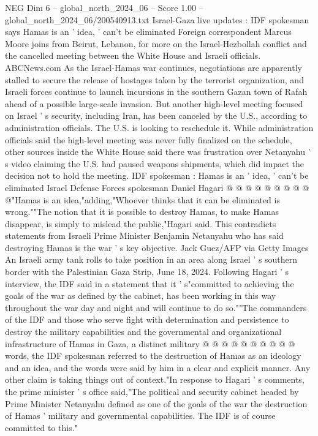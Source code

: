 \begin{textsample}{NEG Dim 6 – global\_north\_2024\_06 – Score 1.00 – global\_north\_2024\_06/200540913.txt}  \label{ex:f6_neg_311}
Israel-Gaza live updates : IDF spokesman says Hamas is an ' idea, ' can't be eliminated Foreign correspondent Marcus Moore joins from Beirut, Lebanon, for more on the Israel-Hezbollah conflict and the cancelled meeting between the White House and Israeli officials.
ABCNews.com As the Israel-Hamas war continues, negotiations are apparently stalled to secure the release of hostages taken by the terrorist organization, and Israeli forces continue to launch incursions in the southern Gazan town of Rafah ahead of a possible large-scale invasion.
But another high-level meeting focused on Israel ' s security, including Iran, has been canceled by the U.S., according to administration officials.
The U.S. is looking to reschedule it.
While administration officials said the high-level meeting was never fully finalized on the schedule, other sources inside the White House said there was frustration over Netanyahu ' s video claiming the U.S. had paused weapons shipments, which did impact the decision not to hold the meeting.
IDF spokesman : Hamas is an ' idea, ' can't be eliminated Israel Defense Forces spokesman Daniel Hagari @ @ @ @ @ @ @ @ @ @"Hamas is an idea,"adding,"Whoever thinks that it can be eliminated is wrong.""The notion that it is possible to destroy Hamas, to make Hamas disappear, is simply to mislead the public,"Hagari said.
This contradicts statements from Israeli Prime Minister Benjamin Netanyahu who has said destroying Hamas is the war ' s key objective.
Jack Guez/AFP via Getty Images An Israeli army tank rolls to take position in an area along Israel ' s southern border with the Palestinian Gaza Strip, June 18, 2024.
Following Hagari ' s interview, the IDF said in a statement that it ' s"committed to achieving the goals of the war as defined by the cabinet, has been working in this way throughout the war day and night and will continue to do so.""The commanders of the IDF and those who serve fight with determination and persistence to destroy the military capabilities and the governmental and organizational infrastructure of Hamas in Gaza, a distinct military @ @ @ @ @ @ @ @ @ @ words, the IDF spokesman referred to the destruction of Hamas as an ideology and an idea, and the words were said by him in a clear and explicit manner.
Any other claim is taking things out of context."In response to Hagari ' s comments, the prime minister ' s office said,"The political and security cabinet headed by Prime Minister Netanyahu defined as one of the goals of the war the destruction of Hamas ' military and governmental capabilities.
The IDF is of course committed to this."

\end{textsample}

